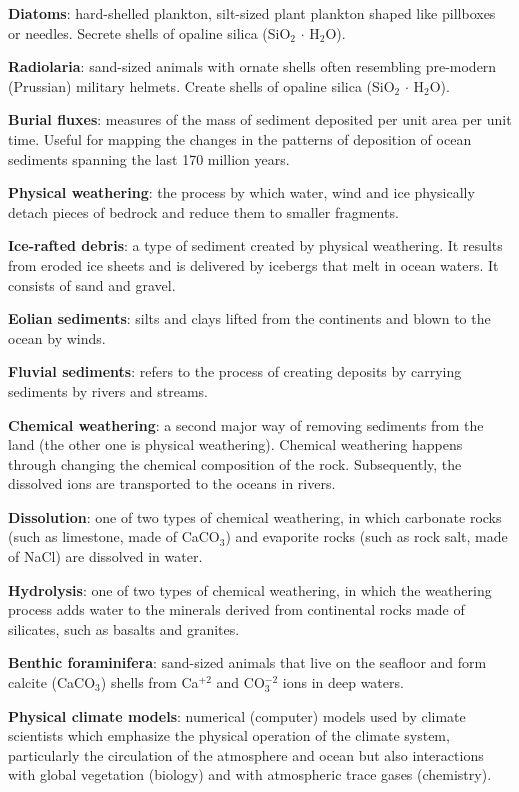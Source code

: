 \textbf{Diatoms}: hard-shelled plankton, silt-sized plant plankton shaped
like pillboxes or needles. Secrete shells of opaline silica
(SiO$_2$ $\cdot$ H$_2$O).

\textbf{Radiolaria}: sand-sized animals with ornate shells often resembling
pre-modern (Prussian) military helmets. Create shells of opaline silica
(SiO$_2$ $\cdot$ H$_2$O).

\textbf{Burial fluxes}: measures of the mass of sediment deposited per unit
area per unit time. Useful for mapping the changes in the patterns of
deposition of ocean sediments spanning the last 170 million years.

\textbf{Physical weathering}: the process by which water, wind and ice
physically detach pieces of bedrock and reduce them to smaller fragments.

\textbf{Ice-rafted debris}: a type of sediment created by physical weathering.
It results from eroded ice sheets and is delivered by icebergs that melt in
ocean waters. It consists of sand and gravel.

\textbf{Eolian sediments}: silts and clays lifted from the continents and blown
to the ocean by winds.

\textbf{Fluvial sediments}: refers to the process of creating deposits by
carrying sediments by rivers and streams.

\textbf{Chemical weathering}: a second major way of removing sediments from
the land (the other one is physical weathering). Chemical weathering happens
through changing the chemical composition of the rock. Subsequently, the
dissolved ions are transported to the oceans in rivers.

\textbf{Dissolution}: one of two types of chemical weathering, in which
carbonate rocks (such as limestone, made of CaCO$_3$) and evaporite rocks
(such as rock salt, made of NaCl) are dissolved in water.

\textbf{Hydrolysis}: one of two types of chemical weathering, in which the
weathering process adds water to the minerals derived from continental rocks
made of silicates, such as basalts and granites.

\textbf{Benthic foraminifera}: sand-sized animals that live on the seafloor and
form calcite (CaCO$_3$) shells from Ca$^{+2}$ and CO$_{3}^{-2}$ ions in deep
waters.

\textbf{Physical climate models}: numerical (computer) models used by climate
scientists which emphasize the physical operation of the climate system,
particularly the circulation of the atmosphere and ocean but also interactions
with global vegetation (biology) and with atmospheric trace gases (chemistry).

